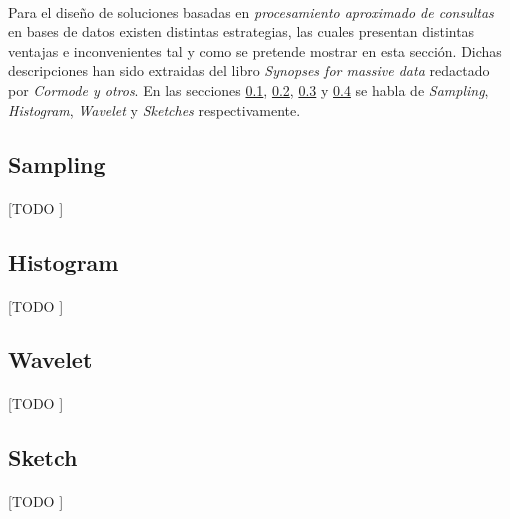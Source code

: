 \documentclass{subfiles}
\begin{document}
      \paragraph{}
      Para el diseño de soluciones basadas en \emph{procesamiento aproximado de consultas} en bases de datos existen distintas estrategias, las cuales presentan distintas ventajas e inconvenientes tal y como se pretende mostrar en esta sección. Dichas descripciones han sido extraidas del libro \emph{Synopses for massive data} \cite{cormode2012synopses} redactado por \emph{Cormode y otros}. En las secciones \ref{sec:sampling}, \ref{sec:histogram}, \ref{sec:wavelet} y \ref{sec:sketch} se habla de \emph{Sampling}, \emph{Histogram}, \emph{Wavelet} y \emph{Sketches} respectivamente.

      \subsection{Sampling}
      \label{sec:sampling}

        \paragraph{}
        [TODO ]

      \subsection{Histogram}
      \label{sec:histogram}

        \paragraph{}
        [TODO ]

      \subsection{Wavelet}
      \label{sec:wavelet}

        \paragraph{}
        [TODO ]

      \subsection{Sketch}
      \label{sec:sketch}

        \paragraph{}
        [TODO ]
\end{document}
